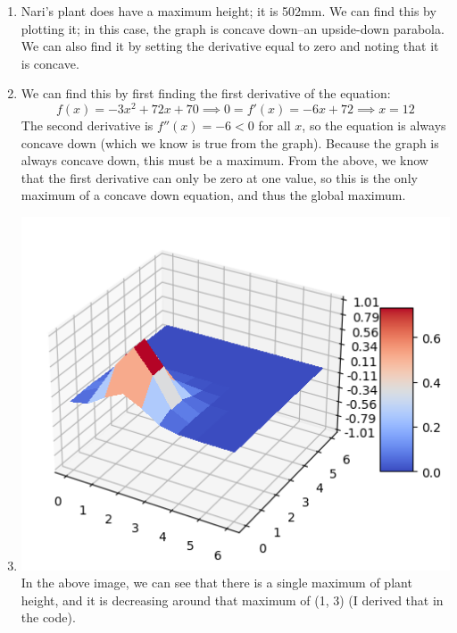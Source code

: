 \documentclass{harvardml}
\theoremstyle{definition}
\theoremstyle{plain}
\begin{document}
\newpage
\begin{enumerate}
    \item Nari's plant does have a maximum height; it is 502mm. We can find this by plotting it; in this case, the graph is concave down--an upside-down parabola. We can also find it by setting the derivative equal to zero and noting that it is concave.  
    \item We can find this by first finding the first derivative of the equation:
    $$
    f(x) = - 3x^2 + 72x + 70 \implies 0 = f'(x) = -6x + 72 \implies x = 12
    $$
    The second derivative is $f''(x) = -6 < 0$ for all $x$, so the equation is always concave down (which we know is true from the graph). Because the graph is always concave down, this must be a maximum. From the above, we know that the first derivative can only be zero at one value, so this is the only maximum of a concave down equation, and thus the global maximum.    
    \item \includegraphics{hw0/height_graph.png} \newline
    In the above image, we can see that there is a single maximum of plant height, and it is decreasing around that maximum of (1, 3) (I derived that in the code). 
\end{enumerate}
\end{document}
